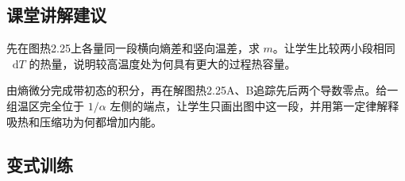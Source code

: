 \documentclass[UTF8,fontset=fandol,a4paper,11pt]{ctexart}
\newcommand{\dd}{\mathop{}\!\mathrm{d}}
\begin{document}


\subsection*{课堂讲解建议}

先在图热2.25上各量同一段横向熵差和竖向温差，求 $m$。让学生比较两小段相同 $\dd T$ 的热量，说明较高温度处为何具有更大的过程热容量。

由熵微分完成带初态的积分，再在解图热2.25A、B追踪先后两个导数零点。给一组温区完全位于 $1/\alpha$ 左侧的端点，让学生只画出图中这一段，并用第一定律解释吸热和压缩功为何都增加内能。



\subsection*{变式训练}
\end{document}
